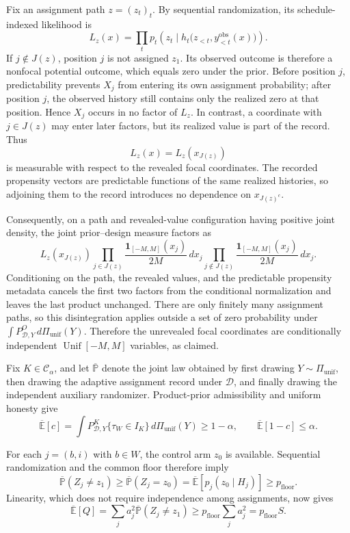 Fix an assignment path \(z=(z_t)_t\).  By sequential randomization, its schedule-indexed likelihood is
\[
 L_z(x)=\prod_t p_t\!\left(z_t\mid
 h_t\bigl(z_{<t},y^{\mathrm{obs}}_{<t}(x)\bigr)\right).
\]
If \(j\notin J(z)\), position \(j\) is not assigned \(z_1\).  Its observed outcome is therefore a nonfocal potential outcome, which equals zero under the prior.  Before position \(j\), predictability prevents \(X_j\) from entering its own assignment probability; after position \(j\), the observed history still contains only the realized zero at that position.  Hence \(X_j\) occurs in no factor of \(L_z\).  In contrast, a coordinate with \(j\in J(z)\) may enter later factors, but its realized value is part of the record.  Thus
\[
 L_z(x)=L_z(x_{J(z)})
\]
is measurable with respect to the revealed focal coordinates.  The recorded propensity vectors are predictable functions of the same realized histories, so adjoining them to the record introduces no dependence on \(x_{J(z)^c}\).

Consequently, on a path and revealed-value configuration having positive joint density, the joint prior--design measure factors as
\[
 L_z(x_{J(z)})
 \prod_{j\in J(z)}\frac{\mathbf 1_{[-M,M]}(x_j)}{2M}\,dx_j
 \prod_{j\notin J(z)}\frac{\mathbf 1_{[-M,M]}(x_j)}{2M}\,dx_j.
\]
Conditioning on the path, the revealed values, and the predictable propensity metadata cancels the first two factors from the conditional normalization and leaves the last product unchanged.  There are only finitely many assignment paths, so this disintegration applies outside a set of zero probability under \(\int P^O_{\mathcal D,Y}\,d\Pi_{\mathrm{unif}}(Y)\).  Therefore the unrevealed focal coordinates are conditionally independent \(\operatorname{Unif}[-M,M]\) variables, as claimed.

Fix \(K\in\mathcal C_\alpha\), and let \(\overline{\mathbb P}\) denote the joint law obtained by first drawing \(Y\sim\Pi_{\mathrm{unif}}\), then drawing the adaptive assignment record under \(\mathcal D\), and finally drawing the independent auxiliary randomizer.  Product-prior admissibility and uniform honesty give
\[
 \overline{\mathbb E}[c]
 =\int P^K_{\mathcal D,Y}\{\tau_W\in I_K\}
       \,d\Pi_{\mathrm{unif}}(Y)
 \ge1-\alpha,
 \qquad
 \overline{\mathbb E}[1-c]\le\alpha.
\]

For each \(j=(b,i)\) with \(b\in W\), the control arm \(z_0\) is available.  Sequential randomization and the common floor therefore imply
\[
 \overline{\mathbb P}(Z_j\ne z_1)
 \ge \overline{\mathbb P}(Z_j=z_0)
 =\overline{\mathbb E}\!\left[p_j(z_0\mid H_j)\right]
 \ge p_{\mathrm{floor}}.
\]
Linearity, which does not require independence among assignments, now gives
\[
 \overline{\mathbb E}[Q]
 =\sum_j a_j^2\overline{\mathbb P}(Z_j\ne z_1)
 \ge p_{\mathrm{floor}}\sum_j a_j^2
 =p_{\mathrm{floor}}S.
\]

